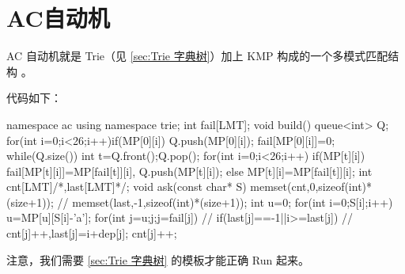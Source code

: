 \section{AC自动机}
AC 自动机就是 Trie（见 \ref{sec:Trie 字典树}）加上 KMP 构成的一个多模式匹配结构
。

代码如下：
\begin{Cpp}
namespace ac{
  using namespace trie;
  int fail[LMT];
  void build(){
    queue<int> Q;
    for(int i=0;i<26;i++)if(MP[0][i]){
      Q.push(MP[0][i]);
      fail[MP[0][i]]=0;
    }
    while(Q.size()){
      int t=Q.front();Q.pop();
      for(int i=0;i<26;i++){
        if(MP[t][i])
          fail[MP[t][i]]=MP[fail[t]][i],
          Q.push(MP[t][i]);
        else
          MP[t][i]=MP[fail[t]][i];
      }
    }
  }
  int cnt[LMT]/*,last[LMT]*/;
  void ask(const char* S){
    memset(cnt,0,sizeof(int)*(size+1));
    // memset(last,-1,sizeof(int)*(size+1));
    int u=0;
    for(int i=0;S[i];i++){
      u=MP[u][S[i]-'a'];
      for(int j=u;j;j=fail[j])
        // if(last[j]==-1||i>=last[j])
        //   cnt[j]++,last[j]=i+dep[j];
        cnt[j]++;
    }
  }
}
\end{Cpp}

注意，我们需要 \ref{sec:Trie 字典树} 的模板才能正确 Run 起来。

